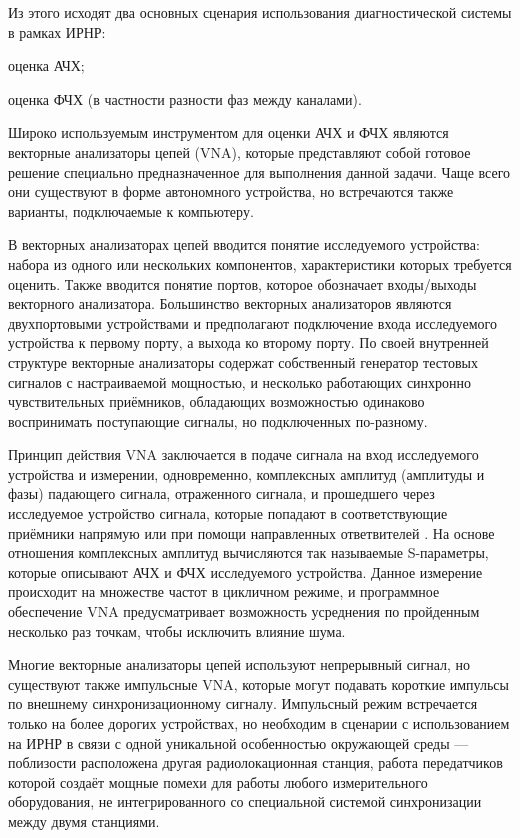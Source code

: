 \documentclass{report}
\begin{document}
Из этого исходят два основных сценария использования диагностической системы в рамках ИРНР:

\begin{enummarker}
    \item оценка АЧХ;
    \item оценка ФЧХ (в частности разности фаз между каналами).
\end{enummarker}

Широко используемым инструментом для оценки АЧХ и ФЧХ являются векторные анализаторы цепей (VNA), которые представляют собой готовое решение специально предназначенное для выполнения данной задачи. Чаще всего они существуют в форме автономного устройства, но встречаются также варианты, подключаемые к компьютеру.

В векторных анализаторах цепей вводится понятие исследуемого устройства: набора из одного или нескольких компонентов, характеристики которых требуется оценить. Также вводится понятие портов, которое обозначает входы/выходы векторного анализатора. Большинство векторных анализаторов являются двухпортовыми устройствами и предполагают подключение входа исследуемого устройства к первому порту, а выхода ко второму порту. По своей внутренней структуре векторные анализаторы содержат собственный генератор тестовых сигналов с настраиваемой мощностью, и несколько работающих синхронно чувствительных приёмников, обладающих возможностью одинаково воспринимать поступающие сигналы, но подключенных по-разному.

Принцип действия VNA заключается в подаче сигнала на вход исследуемого устройства и измерении, одновременно, комплексных амплитуд (амплитуды и фазы) падающего сигнала, отраженного сигнала, и прошедшего через исследуемое устройство сигнала, которые попадают в соответствующие приёмники напрямую или при помощи направленных ответвителей \cite{vna1}. На основе отношения комплексных амплитуд вычисляются так называемые S-параметры, которые описывают АЧХ и ФЧХ исследуемого устройства. Данное измерение происходит на множестве частот в цикличном режиме, и программное обеспечение VNA предусматривает возможность усреднения по пройденным несколько раз точкам, чтобы исключить влияние шума.

Многие векторные анализаторы цепей используют непрерывный сигнал, но существуют также импульсные VNA, которые могут подавать короткие импульсы по внешнему синхронизационному сигналу. Импульсный режим встречается только на более дорогих устройствах, но необходим в сценарии с использованием на ИРНР в связи с одной уникальной особенностью окружающей среды --- поблизости расположена другая радиолокационная станция, работа передатчиков которой создаёт мощные помехи для работы любого измерительного оборудования, не интегрированного со специальной системой синхронизации между двумя станциями.
\end{document}
